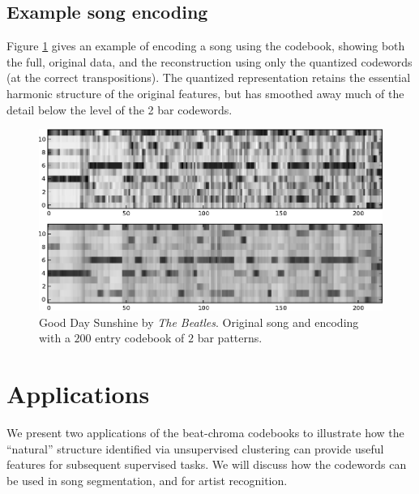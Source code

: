 \documentclass{article}
\begin{document}
\subsection{Example song encoding}

Figure \ref{fig:encodesong} gives an example of encoding a song
using the codebook, showing both the full, original data, and the 
reconstruction using only the quantized codewords (at the correct transpositions).  
The quantized representation retains
the essential harmonic structure of the original features, but has smoothed
away much of the detail below the level of the 2 bar codewords.
%

\begin{figure}[htb]
\begin{center}
\includegraphics[width=.9\columnwidth]{song_encoded}
\end{center}
\caption{\small{Good Day Sunshine by \textit{The Beatles}.
Original song and encoding with a $200$ entry codebook of 
$2$ bar patterns.
}}
\label{fig:encodesong}
\end{figure}


\section{Applications}\label{sec:exps2}
We present two applications of the beat-chroma codebooks
to illustrate how the ``natural'' structure identified via 
unsupervised clustering can provide useful 
features for subsequent supervised tasks.  We will discuss how 
the codewords can be used in song segmentation, and for artist
recognition.  
%
\end{document}
